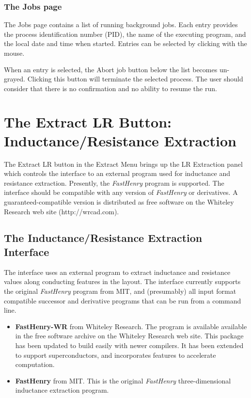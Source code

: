 \subsubsection{The Jobs page}

The {\cb Jobs} page contains a list of running background jobs.  Each
entry provides the process identification number (PID), the name of
the executing program, and the local date and time when started. 
Entries can be selected by clicking with the mouse.

When an entry is selected, the {\cb Abort job} button below the list
becomes un-grayed.  Clicking this button will terminate the selected
process.  The user should consider that there is no confirmation and
no ability to resume the run.


\section{The {\cb Extract LR} Button: Inductance/Resistance Extraction}
The {\cb Extract LR} button in the {\cb Extract Menu} brings up the
{\cb LR Extraction} panel which controls the interface to an external
program used for inductance and resistance extraction.  Presently, the
{\it FastHenry} program is supported.  The interface should be
compatible with any version of {\it FastHenry} or derivatives.  A
guaranteed-compatible version is distributed as free software on the
Whiteley Research web site ({\vt http://wrcad.com}).


\subsection{The Inductance/Resistance Extraction Interface}
\label{fhinterf}
The interface uses an external program to extract inductance and
resistance values along conducting features in the layout.  The
interface currently supports the original {\it FastHenry} program from
MIT, and (presumably) all input format compatible successor and
derivative programs that can be run from a command line.

\begin{itemize}
\item{{\bf FastHenry-WR} from Whiteley Research.  The program is
available available in the free software archive on the Whiteley
Research web site.  This package has been updated to build easily with
newer compilers.  It has been extended to support superconductors, and
incorporates features to accelerate computation.}

\item{{\bf FastHenry} from MIT.  This is the original {\it FastHenry}
three-dimensional inductance extraction program.}
\end{itemize}

